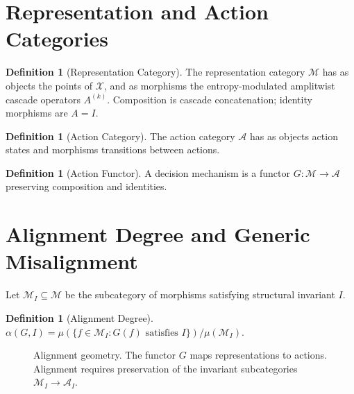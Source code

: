 \documentclass[12pt,a4paper,oneside]{book}
\numberwithin{equation}{chapter}
\theoremstyle{plain}
\theoremstyle{definition}
\newtheorem{definition}[theorem]{Definition}
\theoremstyle{remark}
\begin{document}
\section{Representation and Action Categories}

\begin{definition}[Representation Category]
\label{def:rep-category}
The representation category $\mathcal{M}$ has as objects the points
of $\mathcal{X}$, and as morphisms the entropy-modulated amplitwist
cascade operators $A^{(k)}$. Composition is cascade concatenation;
identity morphisms are $A = I$.
\end{definition}

\begin{definition}[Action Category]
The action category $\mathcal{A}$ has as objects action states and
morphisms transitions between actions.
\end{definition}

\begin{definition}[Action Functor]
A decision mechanism is a functor $G : \mathcal{M} \rightarrow
\mathcal{A}$ preserving composition and identities.
\end{definition}

\section{Alignment Degree and Generic Misalignment}

Let $\mathcal{M}_I \subseteq \mathcal{M}$ be the subcategory of
morphisms satisfying structural invariant $I$.

\begin{definition}[Alignment Degree]
$\alpha(G,I) = \mu(\{f \in \mathcal{M}_I : G(f)\text{ satisfies }
I\}) / \mu(\mathcal{M}_I)$.
\end{definition}

\begin{figure}[htbp]
\centering
{}
\caption{Alignment geometry. The functor $G$ maps representations to
actions. Alignment requires preservation of the invariant
subcategories $\mathcal{M}_I \to \mathcal{A}_I$.}
\label{fig:alignment-geometry}
\end{figure}
\end{document}
